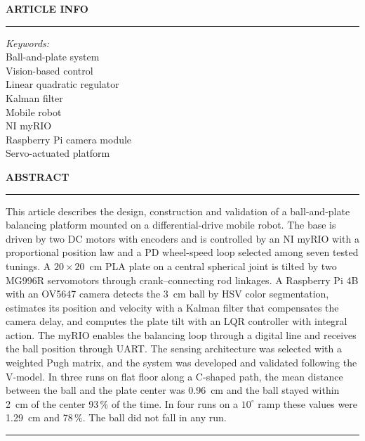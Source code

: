 \documentclass[11pt,letterpaper]{article}
\begin{document}
\noindent
\begin{minipage}[t]{0.32\textwidth}
\textbf{ARTICLE INFO}\par
\vspace{0.05cm}
\noindent\rule{\linewidth}{0.4pt}
\vspace{0.05cm}
\textit{Keywords:}\\
Ball-and-plate system\\
Vision-based control\\
Linear quadratic regulator\\
Kalman filter\\
Mobile robot\\
NI myRIO\\
Raspberry Pi camera module\\
Servo-actuated platform
\end{minipage}%
\hfill
\begin{minipage}[t]{0.64\textwidth}
\textbf{ABSTRACT}\par
\vspace{0.05cm}
\noindent\rule{\linewidth}{0.4pt}
\vspace{0.05cm}
This article describes the design, construction and validation of a
ball-and-plate balancing platform mounted on a differential-drive mobile
robot. The base is driven by two DC motors with encoders and is
controlled by an NI myRIO with a proportional position law and a PD
wheel-speed loop selected among seven tested tunings. A $20\times20$~cm PLA plate on a central
spherical joint is tilted by two MG996R servomotors through
crank--connecting rod linkages. A Raspberry Pi 4B with an OV5647 camera
detects the 3~cm ball by HSV color segmentation, estimates its position
and velocity with a Kalman filter that compensates the camera delay,
and computes the plate tilt with an LQR controller with integral
action. The myRIO
enables the balancing loop through a digital line and receives the ball
position through UART. The sensing architecture was selected with a weighted Pugh matrix, and
the system was developed and validated following the V-model. In three runs on flat floor along
a C-shaped path, the mean distance between the ball and the plate
center was 0.96~cm and the ball stayed within
2~cm of the center 93\,\% of the time. In four runs on a $10^\circ$ ramp
these values were 1.29~cm and 78\,\%. The ball did not fall in any run.
\vspace{0.05cm}
\noindent\rule{\linewidth}{0.4pt}
\vspace{0.05cm}
\end{minipage}
\end{document}
